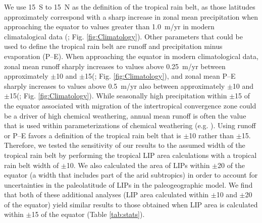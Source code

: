 \documentclass[11pt,letterpaper]{article}
\begin{document}
We use 15\textdegree~S to 15\textdegree~N as the definition of the tropical rain belt, as those latitudes approximately correspond with a sharp increase in zonal mean precipitation when approaching the equator to values greater than 1.0~m/yr in modern climatalogical data (\citealp{Kalnay1996a}; Fig. \ref{fig:Climatology}). Other parameters that could be used to define the tropical rain belt are runoff and precipitation minus evaporation (P--E). When approaching the equator in modern climatological data, zonal mean runoff sharply increases to values above 0.25~m/yr between approximately $\pm$10\textdegree\xspace and $\pm$15\textdegree\xspace (\citealp{Fekete1999a}; Fig. \ref{fig:Climatology}), and zonal mean P--E sharply increases to values above 0.5~m/yr also between approximately $\pm$10\textdegree\xspace and $\pm$15\textdegree\xspace (\citealp{Trenberth2011a}; Fig. \ref{fig:Climatology}). While seasonally high precipitation within $\pm$15\textdegree\xspace of the equator associated with migration of the intertropical convergence zone could be a driver of high chemical weathering, annual mean runoff is often the value that is used within parameterizations of chemical weathering (e.g. \citealp{West2012a}). Using runoff or P--E favors a definition of the tropical rain belt that is $\pm$10\textdegree\xspace rather than $\pm$15\textdegree\xspace. Therefore, we tested the sensitivity of our results to the assumed width of the tropical rain belt by performing the tropical LIP area calculations with a tropical rain belt width of $\pm$10\textdegree\xspace. We also calculated the area of LIPs within $\pm$20\textdegree\xspace of the equator (a width that includes part of the arid subtropics) in order to account for uncertainties in the paleolatitude of LIPs in the paleogeographic model. We find that both of these additional analyses (LIP area calculated within $\pm$10\textdegree\xspace and $\pm$20\textdegree\xspace of the equator) yield similar results to those obtained when LIP area is calculated within $\pm$15\textdegree\xspace of the equator (Table \ref{tab:stats}).
\end{document}
